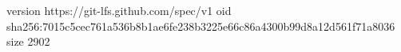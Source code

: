 version https://git-lfs.github.com/spec/v1
oid sha256:7015c5cec761a536b8b1ae6fe238b3225e66c86a4300b99d8a12d561f71a8036
size 2902
